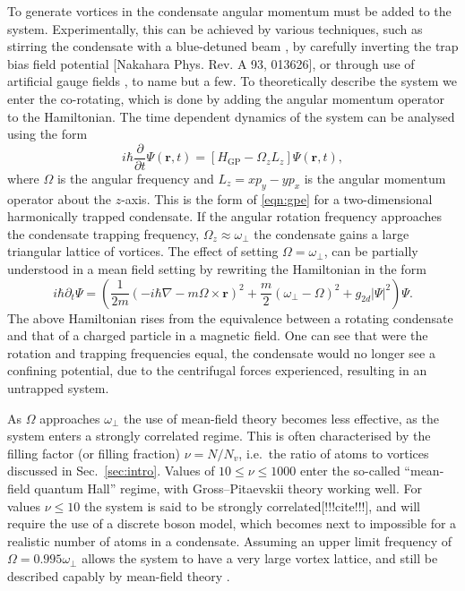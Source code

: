 To generate vortices in the condensate angular momentum must be added to the system. Experimentally, this can be achieved by various techniques, such as stirring the condensate with a blue-detuned beam \cite{Vtx:Raman_prl_2001}, by carefully inverting the trap bias field potential \cite{Vtx:Kawaguchi_pra_2004}[Nakahara Phys. Rev. A 93, 013626], or through use of artificial gauge fields \cite{AO:Dalibard_rmp_2011}, to name but a few. To theoretically describe the system we enter the co-rotating, which is done by adding the angular momentum operator to the Hamiltonian. The time dependent dynamics of the system can be analysed using the form
\begin{equation}\label{eqn:gpe2d}
	i\hbar\frac{\partial}{\partial t}\Psi(\mathbf{r},t) = \left[ H_{\text{GP}}  -  \Omega_z L_z \right] \Psi(\mathbf{r},t),
\end{equation}
where $\Omega$ is the angular frequency and $L_z = xp_y - yp_x$ is the angular momentum operator about the $z$-axis. This is the form of \ref{eqn:gpe} for a two-dimensional harmonically trapped condensate. If the angular rotation frequency approaches the condensate trapping frequency, $\Omega_z \approx \omega_\perp$ the condensate gains a large triangular lattice of vortices.  The effect of setting $\Omega=\omega_\perp$, can be partially understood in a mean field setting by rewriting the Hamiltonian in the form
\begin{equation}
    i\hbar\partial_t \Psi =
    \left(\frac{1}{2m}(-i\hbar\nabla - m\Omega\times\mathbf{r})^2 + \frac{m}{2}(\omega_\perp - \Omega)^2 + g_{2d}|\Psi|^2 \right)\Psi.
\end{equation}
The above Hamiltonian rises from the equivalence between a rotating condensate and that of a charged particle in a magnetic field. One can see that were the rotation and trapping frequencies equal, the condensate would no longer see a confining potential, due to the centrifugal forces experienced, resulting in an untrapped system.

As $\Omega$ approaches $\omega_\perp$ the use of mean-field theory becomes less effective, as the system enters a strongly correlated regime. This is often
characterised by the filling factor (or filling fraction) $\nu=N/N_v$, i.e.~the ratio of atoms to vortices discussed in Sec.~\ref{sec:intro}. Values of $10 \leq \nu \leq 1000$ enter the so-called ``mean-field quantum Hall'' regime, with Gross--Pitaevskii theory working well. For values $\nu \leq 10$ the system is said to be strongly correlated[!!!cite!!!], and will require the use of a discrete boson model, which becomes next to impossible for a realistic number of atoms in a condensate. Assuming an upper limit frequency of $\Omega = 0.995\omega_\perp$ allows the system to have a very large vortex lattice, and still be described capably by mean-field theory \cite{Vtx:Fetter_rmp_2009}.

